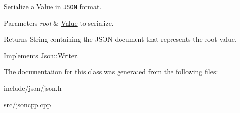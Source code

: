 Serialize a \hyperlink{class_json_1_1_value}{Value} in \href{http://www.json.org}{\tt J\-S\-O\-N} format. 


\begin{DoxyParams}{Parameters}
{\em root} & \hyperlink{class_json_1_1_value}{Value} to serialize. \\
\hline
\end{DoxyParams}
\begin{DoxyReturn}{Returns}
String containing the J\-S\-O\-N document that represents the root value. 
\end{DoxyReturn}


Implements \hyperlink{class_json_1_1_writer}{Json\-::\-Writer}.



The documentation for this class was generated from the following files\-:\begin{DoxyCompactItemize}
\item 
include/json/json.\-h\item 
src/jsoncpp.\-cpp\end{DoxyCompactItemize}
